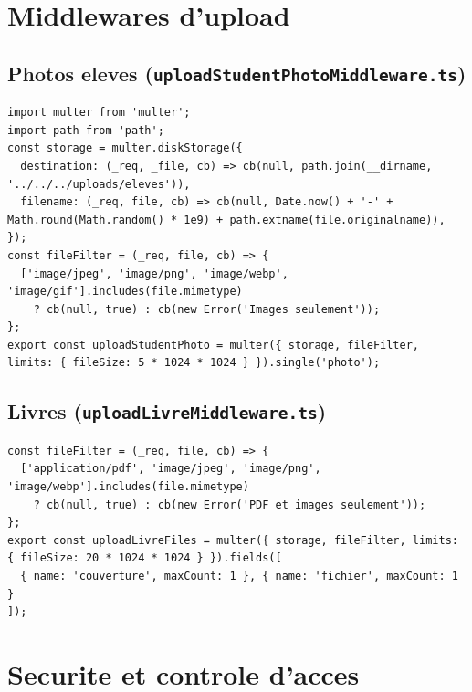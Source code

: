 \documentclass[12pt,a4paper]{article}
\begin{document}
\newpage

\section{Middlewares d'upload}

\subsection{Photos eleves (\texttt{uploadStudentPhotoMiddleware.ts})}

\begin{lstlisting}[style=code]
import multer from 'multer';
import path from 'path';
const storage = multer.diskStorage({
  destination: (_req, _file, cb) => cb(null, path.join(__dirname, '../../../uploads/eleves')),
  filename: (_req, file, cb) => cb(null, Date.now() + '-' + Math.round(Math.random() * 1e9) + path.extname(file.originalname)),
});
const fileFilter = (_req, file, cb) => {
  ['image/jpeg', 'image/png', 'image/webp', 'image/gif'].includes(file.mimetype)
    ? cb(null, true) : cb(new Error('Images seulement'));
};
export const uploadStudentPhoto = multer({ storage, fileFilter, limits: { fileSize: 5 * 1024 * 1024 } }).single('photo');
\end{lstlisting}

\subsection{Livres (\texttt{uploadLivreMiddleware.ts})}

\begin{lstlisting}[style=code]
const fileFilter = (_req, file, cb) => {
  ['application/pdf', 'image/jpeg', 'image/png', 'image/webp'].includes(file.mimetype)
    ? cb(null, true) : cb(new Error('PDF et images seulement'));
};
export const uploadLivreFiles = multer({ storage, fileFilter, limits: { fileSize: 20 * 1024 * 1024 } }).fields([
  { name: 'couverture', maxCount: 1 }, { name: 'fichier', maxCount: 1 }
]);
\end{lstlisting}

\newpage

\section{Securite et controle d'acces}
\end{document}
